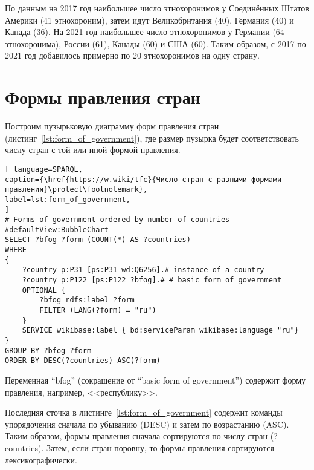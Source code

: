 
По данным на 2017 год наибольшее число этнохоронимов у Соединённых Штатов Америки (41 этнохороним), затем идут Великобритания (40), Германия (40) и Канада (36). На 2021 год наибольшее число этнохоронимов у Германии (64 этнохоронима), России (61), Канады (60) и США (60). Таким образом, с 2017 по 2021 год добавилось примерно по 20 этнохоронимов на одну страну.


\section{Формы правления стран}

Построим пузырьковую диаграмму форм правления стран (листинг~\ref{lst:form_of_government}), где размер пузырка будет соответствовать числу стран с той или иной формой правления.


\begin{lstlisting}[ language=SPARQL, 
caption={\href{https://w.wiki/tfc}{Число стран с разными формами правления}\protect\footnotemark},
label=lst:form_of_government, 
]
# Forms of government ordered by number of countries
#defaultView:BubbleChart
SELECT ?bfog ?form (COUNT(*) AS ?countries)
WHERE 
{
	?country p:P31 [ps:P31 wd:Q6256].# instance of a country
	?country p:P122 [ps:P122 ?bfog].# # basic form of government
	OPTIONAL {
		?bfog rdfs:label ?form
		FILTER (LANG(?form) = "ru")
	}
	SERVICE wikibase:label { bd:serviceParam wikibase:language "ru"}
}
GROUP BY ?bfog ?form
ORDER BY DESC(?countries) ASC(?form)
\end{lstlisting}


Переменная ``bfog'' (сокращение от ``basic form of government'') содержит форму правления, например, <<республику>>. 

Последняя сточка в листинге~\ref{lst:form_of_government} содержит команды упорядочения сначала по убыванию (DESC) и затем по возрастанию (ASC). Таким образом, формы правления сначала сортируются по числу стран (?countries). Затем, если стран поровну, то формы правления сортируются  лексикографически\protect\footnotemark. 

